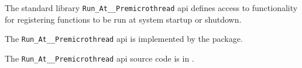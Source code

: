 
The standard library {\tt Run\_At\_\_Premicrothread} api defines access to functionality for registering 
functions to be run at system startup or shutdown. 

The {\tt Run\_At\_\_Premicrothread} api is implemented by the  package.

The {\tt Run\_At\_\_Premicrothread} api source code is in .

